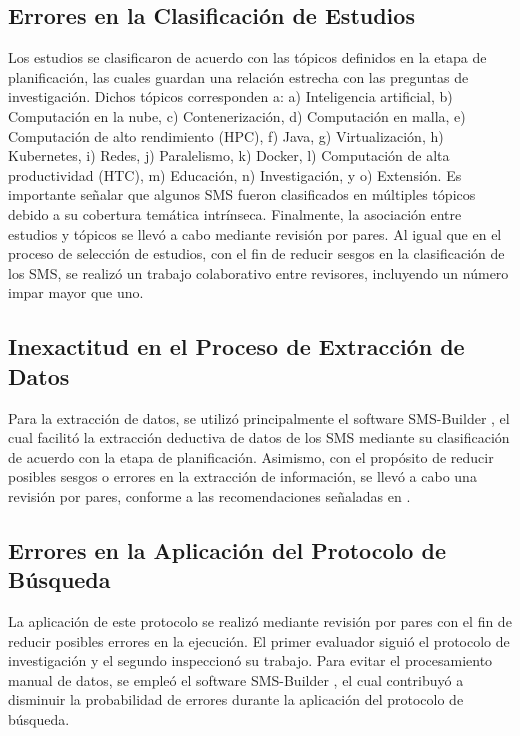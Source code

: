 \subsection{Errores en la Clasificación de Estudios}
Los estudios se clasificaron de acuerdo con las tópicos definidos en la etapa de planificación, las cuales guardan una relación estrecha con las preguntas de investigación. 
Dichos tópicos corresponden a: a) Inteligencia artificial, b) Computación en la nube, c) Contenerización, d) Computación en malla, e) Computación de alto rendimiento (HPC), f) Java, g) Virtualización, h) Kubernetes, i) Redes, j) Paralelismo, k) Docker, l) Computación de alta productividad (HTC), m) Educación, n) Investigación, y o) Extensión.
Es importante señalar que algunos SMS fueron clasificados en múltiples tópicos debido a su cobertura temática intrínseca. Finalmente, la asociación entre estudios y tópicos se llevó a cabo mediante revisión por pares. Al igual que en el proceso de selección de estudios, con el fin de reducir sesgos en la clasificación de los SMS, se realizó un trabajo colaborativo entre revisores, incluyendo un número impar mayor que uno.

\subsection{Inexactitud en el Proceso de Extracción de Datos}
Para la extracción de datos, se utilizó principalmente el software SMS-Builder \cite{sms-builder-repo}, el cual facilitó la extracción deductiva de datos de los SMS mediante su clasificación de acuerdo con la etapa de planificación. Asimismo, con el propósito de reducir posibles sesgos o errores en la extracción de información, se llevó a cabo una revisión por pares, conforme a las recomendaciones señaladas en \cite{Kitchenham2010792}.

\subsection{Errores en la Aplicación del Protocolo de Búsqueda}
La aplicación de este protocolo se realizó mediante revisión por pares con el fin de reducir posibles errores en la ejecución. El primer evaluador siguió el protocolo de investigación y el segundo inspeccionó su trabajo. Para evitar el procesamiento manual de datos, se empleó el software SMS-Builder \cite{sms-builder-repo}, el cual contribuyó a disminuir la probabilidad de errores durante la aplicación del protocolo de búsqueda.
